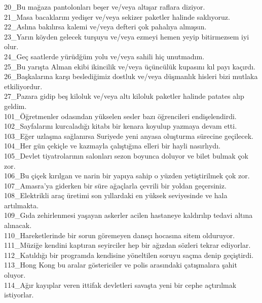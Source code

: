 \begin{myparindent}{0pt}
20\_Bu mağaza pantolonları beşer ve/veya altışar raflara diziyor. \\
21\_Masa bacaklarını yedişer ve/veya sekizer paketler halinde saklıyoruz. \\
22\_Aslına bakılırsa kalemi ve/veya defteri çok pahalıya almışsın. \\
23\_Yarın köyden gelecek turşuyu ve/veya ezmeyi hemen yeyip bitirmezsem iyi olur. \\
24\_Geç saatlerde yürüdğüm yolu ve/veya sahili hiç unutmadım. \\
25\_Bu yarışta Alman ekibi ikincilik ve/veya üçüncülük kupasını kıl payı kaçırdı. \\
26\_Başkalarına karşı beslediğimiz dostluk ve/veya düşmanlık hisleri bizi mutlaka etkiliyordur. \\
27\_Pazara gidip beş kiloluk ve/veya altı kiloluk paketler halinde patates alıp geldim. \\
101\_Öğretmenler odasından yükselen sesler bazı öğrencileri endişelendirdi.\\
102\_Sayfalarını kurcaladığı kitabı bir kenara koyulup yazmaya devam etti.\\
103\_Eğer uzlaşma sağlanırsa Suriyede yeni anyasa oluşturma sürecine geçilecek.\\
104\_Her gün çekiçle ve kazmayla çalıştığına elleri bir hayli nasırlıydı.\\
105\_Devlet tiyatrolarının salonları sezon boyunca doluyor ve bilet bulmak çok zor.\\
106\_Bu çiçek kırılgan ve narin bir yapıya sahip o yüzden yetiştirilmek çok zor.\\
107\_Amasra'ya giderken bir süre ağaçlarla çevrili bir yoldan geçersiniz.\\
108\_Elektrikli araç üretimi son yıllardaki en yüksek seviyesinde ve hala artılmakta.\\
109\_Gıda zehirlenmesi yaşayan askerler acilen hastaneye kaldırılıp tedavi altına alınacak.\\
110\_Hareketlerinde bir sorun göremeyen dansçı hocasına sitem olduruyor.\\
111\_Müziğe kendini kaptıran seyirciler hep bir ağızdan sözleri tekrar ediyorlar.\\
112\_Katıldığı bir programda kendisine yöneltilen soruyu saçma denip geçiştirdi.\\
113\_Hong Kong bu aralar göstericiler ve polis arasındaki çatışmalara şahit oluyor.\\
114\_Ağır kayıplar veren ittifak devletleri savaşta yeni bir cephe açtırılmak istiyorlar.\\

\end{myparindent}
